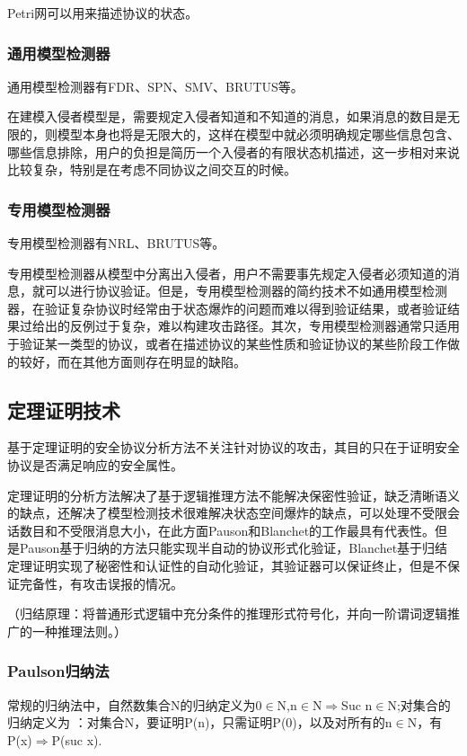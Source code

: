 \documentclass[cs4size,a4pape,UTF8]{ctexart}
\numberwithin{equation}{section}
\numberwithin{table}{section}
\numberwithin{figure}{section}
\begin{document}
Petri网可以用来描述协议的状态。

\subsubsection{通用模型检测器}
通用模型检测器有FDR、SPN、SMV、BRUTUS等。

在建模入侵者模型是，需要规定入侵者知道和不知道的消息，如果消息的数目是无限的，则模型本身也将是无限大的，这样在模型中就必须明确规定哪些信息包含、哪些信息排除，用户的负担是简历一个入侵者的有限状态机描述，这一步相对来说比较复杂，特别是在考虑不同协议之间交互的时候\cite{3}。

\subsubsection{专用模型检测器}
专用模型检测器有NRL、BRUTUS等。

专用模型检测器从模型中分离出入侵者，用户不需要事先规定入侵者必须知道的消息，就可以进行协议验证。但是，专用模型检测器的简约技术不如通用模型检测器，在验证复杂协议时经常由于状态爆炸的问题而难以得到验证结果，或者验证结果过给出的反例过于复杂，难以构建攻击路径。其次，专用模型检测器通常只适用于验证某一类型的协议，或者在描述协议的某些性质和验证协议的某些阶段工作做的较好，而在其他方面则存在明显的缺陷\cite{3}。


\subsection{定理证明技术}
基于定理证明的安全协议分析方法不关注针对协议的攻击，其目的只在于证明安全协议是否满足响应的安全属性。

定理证明的分析方法解决了基于逻辑推理方法不能解决保密性验证，缺乏清晰语义的缺点，还解决了模型检测技术很难解决状态空间爆炸的缺点，可以处理不受限会话数目和不受限消息大小，在此方面Pauson和Blanchet的工作最具有代表性。但是Pauson基于归纳的方法只能实现半自动的协议形式化验证，Blanchet基于归结定理证明实现了秘密性和认证性的自动化验证，其验证器可以保证终止，但是不保证完备性，有攻击误报的情况\cite{6}。

（归结原理：将普通形式逻辑中充分条件的推理形式符号化，并向一阶谓词逻辑推广的一种推理法则。）

\subsubsection{Paulson归纳法}
常规的归纳法中，自然数集合N的归纳定义为0$\in$N,n$\in$N$\Rightarrow$Suc n$\in$N;对集合的归纳定义为 ：对集合N，要证明P(n)，只需证明P(0)，以及对所有的n$\in$N，有P(x)$\Rightarrow$P(suc x).
\end{document}
